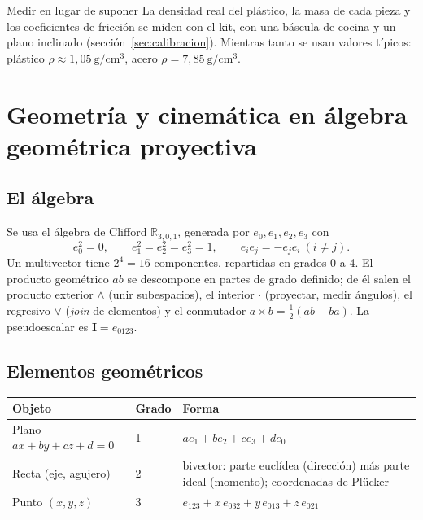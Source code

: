 \documentclass[11pt,a4paper]{article}
\numberwithin{equation}{section}
\begin{document}
\begin{decision}{Medir en lugar de suponer}
La densidad real del plástico, la masa de cada pieza y los coeficientes de fricción se miden con el kit, con una
báscula de cocina y un plano inclinado (sección~\ref{sec:calibracion}). Mientras tanto se usan valores típicos: plástico
$\rho\approx1{,}05\ \mathrm{g/cm^3}$, acero $\rho = 7{,}85\ \mathrm{g/cm^3}$.
\end{decision}

\section{Geometría y cinemática en álgebra geométrica proyectiva}\label{sec:pga}

\subsection{El álgebra}
Se usa el álgebra de Clifford $\mathbb{R}_{3,0,1}$, generada por $e_0, e_1, e_2, e_3$ con
\begin{equation}
  e_0^2 = 0,\qquad e_1^2 = e_2^2 = e_3^2 = 1,\qquad e_ie_j = -e_je_i\ (i\neq j).
\end{equation}
Un multivector tiene $2^4 = 16$ componentes, repartidas en grados 0 a 4. El producto geométrico $ab$ se descompone en
partes de grado definido; de él salen el producto exterior $\wedge$ (unir subespacios), el interior $\cdot$ (proyectar,
medir ángulos), el regresivo $\vee$ (\emph{join} de elementos) y el conmutador $a\times b = \tfrac12(ab - ba)$. La
pseudoescalar es $\mathbf{I} = e_{0123}$.

\subsection{Elementos geométricos}
\begin{tabularx}{\linewidth}{@{}l l Y@{}}
\toprule
\textbf{Objeto} & \textbf{Grado} & \textbf{Forma}\\
\midrule
Plano $ax + by + cz + d = 0$ & 1 & $a e_1 + b e_2 + c e_3 + d e_0$\\
Recta (eje, agujero) & 2 & bivector: parte euclídea (dirección) más parte ideal (momento); coordenadas de Plücker\\
Punto $(x,y,z)$ & 3 & $e_{123} + x\,e_{032} + y\,e_{013} + z\,e_{021}$\\
\bottomrule
\end{tabularx}
\end{document}
